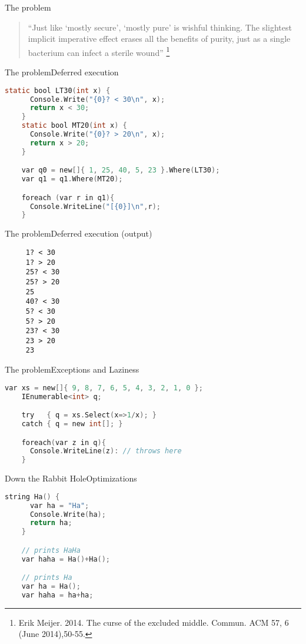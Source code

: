 \documentclass[rail]{beamer}
\begin{document}
\begin{frame}{The problem}
    \begin{quote}
    ``Just like `mostly secure', `mostly pure' is wishful
    thinking. The slightest implicit imperative effect erases all the
    benefits of purity, just as a single bacterium can infect a
    sterile wound''
    \footnote[frame,1] {Erik Meijer. 2014. The curse of the
      excluded middle. Commun. ACM 57, 6 (June 2014),50-55.}
  \end{quote}
\end{frame}


\begin{frame}[fragile]{The problem}{Deferred execution}
  \begin{lstlisting}[language=C]
    static bool LT30(int x) {
      Console.Write("{0}? < 30\n", x);
      return x < 30;
    }
    static bool MT20(int x) {
      Console.Write("{0}? > 20\n", x);
      return x > 20;
    }

    var q0 = new[]{ 1, 25, 40, 5, 23 }.Where(LT30);
    var q1 = q1.Where(MT20);

    foreach (var r in q1){
      Console.WriteLine("[{0}]\n",r);
    }
  \end{lstlisting}
\end{frame}

\begin{frame}[fragile]{The problem}{Deferred execution (output)}
\begin{verbatim}
     1? < 30
     1? > 20
     25? < 30
     25? > 20
     25
     40? < 30
     5? < 30
     5? > 20
     23? < 30
     23 > 20
     23
\end{verbatim}
\end{frame}

\begin{frame}[fragile]{The problem}{Exceptions and Laziness}
  \begin{lstlisting}[language=C]
    var xs = new[]{ 9, 8, 7, 6, 5, 4, 3, 2, 1, 0 };
    IEnumerable<int> q;

    try   { q = xs.Select(x=>1/x); }
    catch { q = new int[]; }

    foreach(var z in q){
      Console.WriteLine(z): // throws here
    }
  \end{lstlisting}
\end{frame}

\begin{frame}[fragile]{Down the Rabbit Hole}{Optimizations}
  \begin{lstlisting}[language=C]
    string Ha() {
      var ha = "Ha";
      Console.Write(ha);
      return ha;
    }

    // prints HaHa
    var haha = Ha()+Ha();

    // prints Ha
    var ha = Ha();
    var haha = ha+ha;
  \end{lstlisting}
\end{frame}
\end{document}
